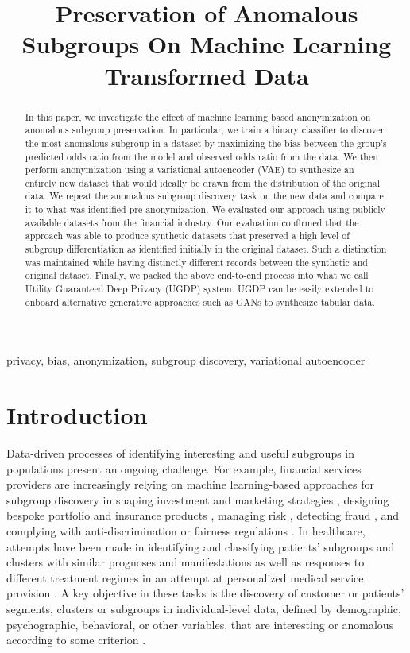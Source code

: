 \documentclass[dvipdft]{article}
\title{Preservation of Anomalous Subgroups On Machine Learning Transformed Data}
\begin{document}
\ninept
%
\maketitle

\begin{abstract}
In this paper, we investigate the effect of machine learning based anonymization on anomalous subgroup preservation. In particular, we train a binary classifier to discover the most anomalous subgroup in a dataset by maximizing the bias between the group’s predicted odds ratio from the model and observed odds ratio from the data. We then perform anonymization using a variational autoencoder (VAE) to synthesize an entirely new dataset that would ideally be drawn from the distribution of the original data. We repeat the anomalous subgroup discovery task on the new data and compare it to what was identified pre-anonymization. We evaluated our approach using publicly available datasets from the financial industry. Our evaluation confirmed that the approach was able to produce synthetic datasets that preserved a high level of subgroup differentiation as identified initially in the original dataset. Such a distinction was maintained while having distinctly different records between the synthetic and original dataset.  Finally, we packed the above end-to-end process into what we call Utility Guaranteed Deep Privacy (UGDP) system.  UGDP can be easily extended to onboard alternative generative approaches such as GANs to synthesize tabular data. 
\end{abstract}
%
\begin{keywords}
privacy, bias, anonymization, subgroup discovery, variational autoencoder
\end{keywords}
%
\section{Introduction}
\label{sec:intro}

Data-driven processes of identifying interesting and useful subgroups in populations present an ongoing challenge. For example, financial services providers are increasingly relying on machine learning-based approaches for subgroup discovery in shaping investment and marketing strategies \cite{Lopez2019, SunMXZX2014},  designing bespoke portfolio and insurance products \cite{LambertonBH2017,Thesmar2019}, managing risk \cite{Liebergen2017}, detecting fraud \cite{SharmaP2012}, and complying with anti-discrimination or fairness regulations \cite{Bruckner2018}. In healthcare, attempts have been made in identifying and classifying patients' subgroups and clusters with similar prognoses and manifestations as well as responses to different treatment regimes in an attempt at personalized medical service provision \cite{Chen2014,Knevel2019,Ferreira2018,Nielsen2017}. A key objective in these tasks is the discovery of customer or patients' segments, clusters or subgroups in individual-level data, defined by demographic, psychographic, behavioral,  or other variables, that are interesting or anomalous according to some criterion \cite{Rueping2009}.
\end{document}
